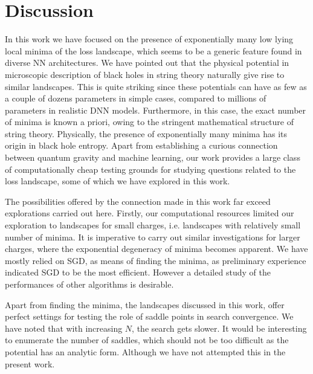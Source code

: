 \documentclass[12pt,a4paper]{JHEP3}
\begin{document}
\section{Discussion} \label{s5}
In this work we have focused on the presence of exponentially many low lying local minima of the loss landscape, which seems to be a generic feature found in diverse NN architectures. We have pointed out that the physical potential in microscopic description of black holes in string theory naturally give rise to similar landscapes.
This is quite striking since these potentials can have as few as a couple of dozens parameters in simple cases, compared to millions of parameters in realistic DNN models. Furthermore, in this case, the exact number of minima is known a priori, owing to the stringent mathematical structure of string theory. Physically, the presence of exponentially many minima has its origin in black hole entropy.
Apart from establishing a curious connection between quantum gravity and machine learning, our work provides a large class of computationally cheap testing grounds for studying questions related to the loss landscape, some of which we have explored in this work.


The possibilities offered by the connection made in this work far exceed explorations carried out here. 
Firstly, our computational resources limited our exploration to landscapes for small charges, i.e. landscapes with relatively small number of minima. It is imperative to carry out similar investigations for larger charges, where the exponential degeneracy of minima becomes apparent. We have mostly relied on SGD, as means of finding the minima, as preliminary experience indicated SGD to be the most efficient. However a detailed study of the performances of other algorithms is desirable. 

Apart from finding the minima, the landscapes discussed  in this work, offer perfect settings for testing the role of saddle points in search convergence. We have noted that with increasing $N$, the search gets slower. It would be interesting to enumerate the number of saddles, which should not be too difficult as the potential has an analytic form. Although we have not attempted this in the present work. 
\end{document}
